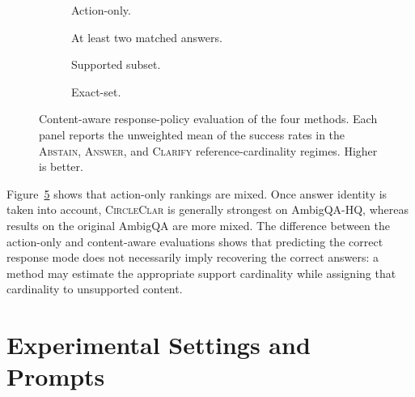 \begin{figure}[t!]
\centering
\begin{subfigure}[t]{0.49\textwidth}
\centering
\resizebox{\linewidth}{!}{}
\caption{Action-only.}
\label{fig:policy-action-only}
\end{subfigure}\hfill
\begin{subfigure}[t]{0.49\textwidth}
\centering
\resizebox{\linewidth}{!}{}
\caption{At least two matched answers.}
\label{fig:policy-two-matched}
\end{subfigure}

\medskip

\begin{subfigure}[t]{0.49\textwidth}
\centering
\resizebox{\linewidth}{!}{}
\caption{Supported subset.}
\label{fig:policy-main}
\end{subfigure}\hfill
\begin{subfigure}[t]{0.49\textwidth}
\centering
\resizebox{\linewidth}{!}{}
\caption{Exact-set.}
\label{fig:policy-exact-set}
\end{subfigure}

\caption{Content-aware response-policy evaluation of the four methods. Each panel reports the unweighted mean of the success rates in the \textsc{Abstain}, \textsc{Answer}, and \textsc{Clarify} reference-cardinality regimes. Higher is better.}
\label{fig:response-policy-criterion-sensitivity}
\end{figure}

Figure~\ref{fig:response-policy-criterion-sensitivity} shows that action-only rankings are mixed. Once answer identity is taken into account, \textsc{CircleClar} is generally strongest on AmbigQA-HQ, whereas results on the original AmbigQA are more mixed. The difference between the action-only and content-aware evaluations shows that predicting the correct response mode does not necessarily imply recovering the correct answers: a method may estimate the appropriate support cardinality while assigning that cardinality to unsupported content.

\FloatBarrier


\section{Experimental Settings and Prompts}
\label{app:implementation}

